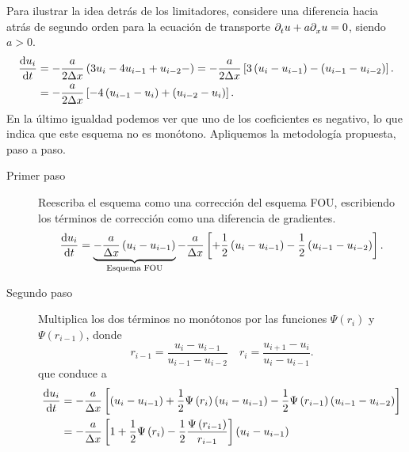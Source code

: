Para ilustrar la idea detrás de los limitadores, considere una
diferencia hacia atrás de segundo orden para la ecuación de
transporte $\difcp{u}{t}+a\difcp{u}{x}=0$, siendo $a>0$.
\begin{align*}
	\diff{u_{i}}{t} & =
	-\frac{a}{2\Delta x}
	\left(3u_{i}-4u_{i-1}+u_{i-2}-\right)=
	-\frac{a}{2\Delta x}
	\left[
		3\left(u_{i}-u_{i-1}\right)-
		\left(u_{i-1}-u_{i-2}\right)
	\right].            \\
	                & =
	-\frac{a}{2\Delta x}
	\left[
		-4\left(u_{i-1}-u_{i}\right)+
		\left(u_{i-2}-u_{i}\right)
		\right].
\end{align*}
En la último igualdad podemos ver que uno de los coeficientes es
negativo, lo que indica que este esquema no es monótono.
Apliquemos la metodología propuesta, paso a paso.
\begin{description}
	\item[Primer paso]

	      Reescriba el esquema como una corrección
	      del esquema FOU, escribiendo los términos de corrección como
	      una diferencia de gradientes.
	      \begin{equation*}
		      \diff{u_{i}}{t}=
		      \underbrace{
			      -\frac{a}{\Delta x}
			      \left(u_i-u_{i-1}\right)}_{\text{Esquema FOU}}-
		      \frac{a}{\Delta x}
		      \left[
			      +\frac{1}{2}
			      \left(u_i-u_{i-1}\right)-
			      \frac{1}{2}
			      \left(u_{i-1}-u_{i-2}
			      \right)
			      \right].
	      \end{equation*}


	\item[Segundo paso]

	      Multiplica los dos términos no monótonos por las funciones
	      $\Psi\left(r_{i}\right)$ y $\Psi\left(r_{i-1}\right)$, donde
	      \begin{equation*}
		      r_{i-1}=
		      \frac{u_{i}-u_{i-1}}{u_{i-1}-u_{i-2}}\quad
		      r_i=\frac{u_{i+1}-u_i}{u_i-u_{i-1}}.
	      \end{equation*}
	      que conduce a
	      \begin{align*}
		      \diff{u_{i}}{t} & =
		      -\frac{a}{\Delta x}
		      \left[
			      \left(u_{i}-u_{i-1}\right)+
			      \frac{1}{2}
			      \Psi\left(r_{i}\right)
			      \left(u_{i}-u_{i-1}\right)-
			      \frac{1}{2}
			      \Psi\left(r_{i-1}\right)
			      \left(u_{i-1}-u_{i-2}\right)
		      \right]             \\
		                      & =
		      -\frac{a}{\Delta x}
		      \left[
			      1+
			      \frac{1}{2}
			      \Psi\left(r_{i}\right)-
			      \frac{1}{2}
			      \frac{\Psi\left(r_{i-1}\right)}{r_{i-1}}
			      \right]
		      \left(
		      u_{i}-u_{i-1}
		      \right)
	      \end{align*}


\end{description}
